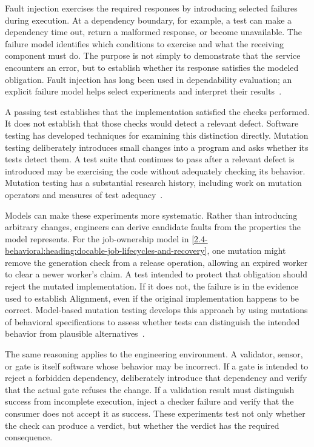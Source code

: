 Fault injection exercises the required responses by introducing selected failures during execution. At a dependency boundary, for example, a test can make a dependency time out, return a malformed response, or become unavailable. The failure model identifies which conditions to exercise and what the receiving component must do. The purpose is not simply to demonstrate that the service encounters an error, but to establish whether its response satisfies the modeled obligation. Fault injection has long been used in dependability evaluation; an explicit failure model helps select experiments and interpret their results~\citep{hsueh1997fault}.

A passing test establishes that the implementation satisfied the checks performed. It does not establish that those checks would detect a relevant defect. Software testing has developed techniques for examining this distinction directly. Mutation testing deliberately introduces small changes into a program and asks whether its tests detect them. A test suite that continues to pass after a relevant defect is introduced may be exercising the code without adequately checking its behavior. Mutation testing has a substantial research history, including work on mutation operators and measures of test adequacy~\citep{demillo1978hints,jia2011analysis}.

Models can make these experiments more systematic. Rather than introducing arbitrary changes, engineers can derive candidate faults from the properties the model represents. For the job-ownership model in \autoref{2.4-behavioral:heading:docable-job-lifecycles-and-recovery}, one mutation might remove the generation check from a release operation, allowing an expired worker to clear a newer worker's claim. A test intended to protect that obligation should reject the mutated implementation. If it does not, the failure is in the evidence used to establish Alignment, even if the original implementation happens to be correct. Model-based mutation testing develops this approach by using mutations of behavioral specifications to assess whether tests can distinguish the intended behavior from plausible alternatives~\citep{aichernig2015modelmutation}.

The same reasoning applies to the engineering environment. A validator, sensor, or gate is itself software whose behavior may be incorrect. If a gate is intended to reject a forbidden dependency, deliberately introduce that dependency and verify that the actual gate refuses the change. If a validation result must distinguish success from incomplete execution, inject a checker failure and verify that the consumer does not accept it as success. These experiments test not only whether the check can produce a verdict, but whether the verdict has the required consequence.

